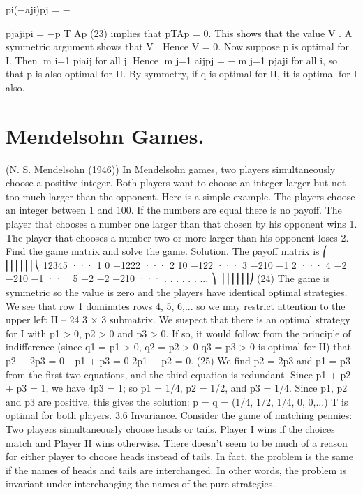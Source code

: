\documentclass[]{report}
\begin{document}
pi(−aji)pj = −


pjajipi = −p
T
Ap (23)
implies that pTAp = 0. This shows that the value V . A symmetric argument shows
that V . Hence V = 0. Now suppose p is optimal for I. Then m
i=1 piaij  for all
j. Hence m
j=1 aijpj = −m
j=1 pjaji  for all i, so that p is also optimal for II. By
symmetry, if q is optimal for II, it is optimal for I also.
\section{Mendelsohn Games.}
 (N. S. Mendelsohn (1946)) In Mendelsohn games, two players
simultaneously choose a positive integer. Both players want to choose an integer larger
but not too much larger than the opponent. Here is a simple example. The players choose
an integer between 1 and 100. If the numbers are equal there is no payoff. The player that
chooses a number one larger than that chosen by his opponent wins 1. The player that
chooses a number two or more larger than his opponent loses 2. Find the game matrix
and solve the game.
Solution. The payoff matrix is
⎛
⎜⎜⎜⎜⎜⎜⎝
12345 ···
1 0 −1222 ···
2 10 −122 ···
3 −210 −1 2 ···
4 −2 −210 −1 ···
5 −2 −2 −210 ··· .
.
. .
.
. ...
⎞
⎟⎟⎟⎟⎟⎟⎠
(24)
The game is symmetric so the value is zero and the players have identical optimal strategies.
We see that row 1 dominates rows 4, 5, 6,... so we may restrict attention to the upper left
II – 24
3 × 3 submatrix. We suspect that there is an optimal strategy for I with p1 > 0, p2 > 0
and p3 > 0. If so, it would follow from the principle of indifference (since q1 = p1 > 0,
q2 = p2 > 0 q3 = p3 > 0 is optimal for II) that
p2 − 2p3 = 0
−p1 + p3 = 0
2p1 − p2 = 0. (25)
We find p2 = 2p3 and p1 = p3 from the first two equations, and the third equation is
redundant. Since p1 + p2 + p3 = 1, we have 4p3 = 1; so p1 = 1/4, p2 = 1/2, and p3 = 1/4.
Since p1, p2 and p3 are positive, this gives the solution: p = q = (1/4, 1/2, 1/4, 0, 0,...)
T is
optimal for both players.
3.6 Invariance. Consider the game of matching pennies: Two players simultaneously
choose heads or tails. Player I wins if the choices match and Player II wins otherwise.
There doesn’t seem to be much of a reason for either player to choose heads instead of
tails. In fact, the problem is the same if the names of heads and tails are interchanged. In
other words, the problem is invariant under interchanging the names of the pure strategies.
\end{document}
